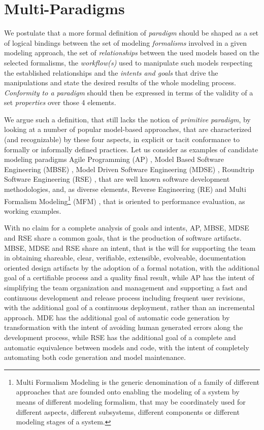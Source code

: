 \section{Multi-Paradigms}
\label{sec:Multi-Paradigms}


\newpage
We postulate that a more formal definition of \textit{paradigm} should be shaped as a set of logical bindings between the set of modeling \textit{formalisms} involved in a given modeling approach, the set of \textit{relationships} between the used models based on the selected formalisms, the \textit{workflow(s)} used to manipulate such models respecting the established relationships and the \textit{intents and goals} that drive the manipulations and state the desired results of the whole modeling process.
\textit{Conformity to a paradigm} should then be expressed in terms of the validity of a set \textit{properties} over those 4 elements.

We argue such a definition, that still lacks the notion of \textit{primitive paradigm}, by looking at a number of popular model-based approaches, that are characterized (and recognizable) by these four aspects, in explicit or tacit conformance to formally or informally defined practices. Let us consider as examples of candidate modeling paradigms Agile Programming (AP) \cite{}, Model Based Software Engineering (MBSE) \cite{}, Model Driven Software Engineering (MDSE) \cite{}, Roundtrip Software Engineering (RSE) \cite{}, that are well known software development methodologies, and, as diverse elements, Reverse Engineering (RE) \cite{} and Multi Formalism Modeling\footnote{Multi Formalism Modeling is the generic denomination of a family of different approaches that are founded onto enabling the modeling of a system by means of different modeling formalism, that may be coordinately used for different aspects, different subsystems, different components or different modeling stages of a system.} (MFM) \cite{MauroChapter}, that is oriented to performance evaluation, as working examples.

With no claim for a complete analysis of goals and intents, AP, MBSE, MDSE and RSE share a common goals, that is the production of software artifacts. MBSE, MDSE and RSE share an intent, that is the will for supporting the team in obtaining shareable, clear, verifiable, extensible, evolveable, documentation oriented design artifacts by the adoption of a formal notation, with the additional goal of a certifiable process and a quality final result, while AP has the intent of simplifying the team organization and management and supporting a fast and continuous development and release process including frequent user revisions, with the additional goal of a continuous deployment, rather than an incremental approach. MDE has the additional goal of automatic code generation by transformation with the intent of avoiding human generated errors along the development process, while RSE has the additional goal of a complete and automatic equivalence between models and code, with the intent of completely automating both code generation and model maintenance.

